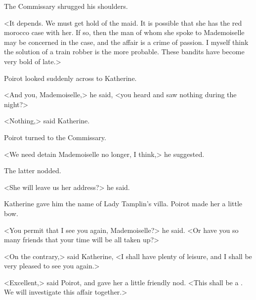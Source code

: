 The Commissary shrugged his shoulders.

<It depends. We must get hold of the maid. It is possible that she has the red morocco case with her. If so, then the man of whom she spoke to Mademoiselle may be concerned in the case, and the affair is a crime of passion. I myself think the solution of a train robber is the more probable. These bandits have become very bold of late.>

Poirot looked suddenly across to Katherine.

<And you, Mademoiselle,> he said, <you heard and saw nothing during the night?>

<Nothing,> said Katherine.

Poirot turned to the Commissary.

<We need detain Mademoiselle no longer, I think,> he suggested.

The latter nodded.

<She will leave us her address?> he said.

Katherine gave him the name of Lady Tamplin's villa. Poirot made her a little bow.

<You permit that I see you again, Mademoiselle?> he said. <Or have you so many friends that your time will be all taken up?>

<On the contrary,> said Katherine, <I shall have plenty of leisure, and I shall be very pleased to see you again.>

<Excellent,> said Poirot, and gave her a little friendly nod. <This shall be a . We will investigate this affair together.>